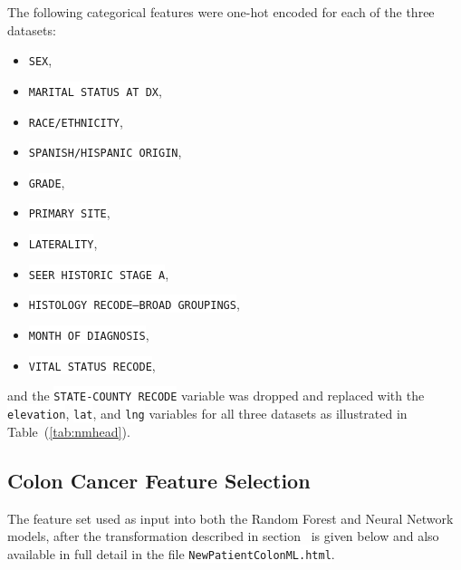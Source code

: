 \documentclass[10pt,letterpaper]{article}
\newcommand{\codewhite}[1]{\colorbox{white}{\texttt{#1}}}
\begin{document}
The following categorical features were one-hot encoded for each of the three datasets:

\begin{itemize}[noitemsep]
\item \codewhite{SEX},
\item  \codewhite{MARITAL STATUS AT DX},
\item \codewhite{RACE/ETHNICITY},
\item \codewhite{SPANISH/HISPANIC ORIGIN},
\item \codewhite{GRADE},
\item \codewhite{PRIMARY SITE},
\item \codewhite{LATERALITY},
\item \codewhite{SEER HISTORIC STAGE A},
\item \codewhite{HISTOLOGY RECODE--BROAD GROUPINGS},
\item \codewhite{MONTH OF DIAGNOSIS},
\item  \codewhite{VITAL STATUS RECODE},
\end{itemize}
and the \codewhite{STATE-COUNTY RECODE} variable was dropped and replaced with the \codewhite{elevation}, \codewhite{lat}, and \codewhite{lng} variables for all three datasets as illustrated in Table~(\ref{tab:nmhead}).


\subsection*{Colon Cancer Feature Selection}
\label{Colon_Cancer_Feature_Selection}


The feature set used as input into both the Random Forest and Neural Network models, after the transformation described in section~ is given below and also available in full detail in the file 
\codewhite{NewPatientColonML.html}.
\end{document}
